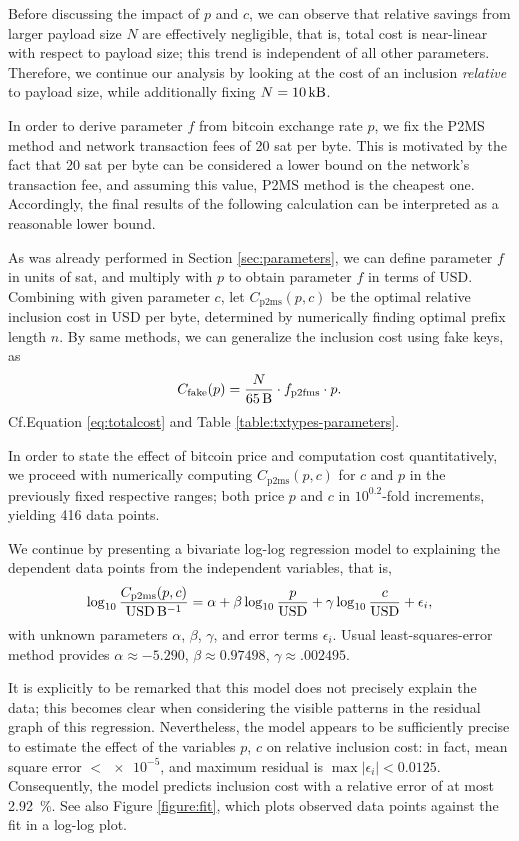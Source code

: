 \documentclass[a4paper,11pt,titlepage]{scrbook}
\begin{document}
Before discussing the impact of $p$ and $c$, we can observe that relative savings from larger payload size $N$ are effectively negligible, that is, total cost is near-linear with respect to payload size;
this trend is independent of all other parameters.
Therefore, we continue our analysis by looking at the cost of an inclusion \emph{relative} to payload size, while additionally fixing $N=\SI{10}{\kilo\byte}$.

In order to derive parameter $f$ from bitcoin exchange rate $p$, we fix the P2MS method and network transaction fees of 20 sat per byte.
This is motivated by the fact that 20 sat per byte can be considered a lower bound on the network's transaction fee, and assuming this value, P2MS method is the cheapest one.
Accordingly, the final results of the following calculation can be interpreted as a reasonable lower bound.

As was already performed in Section \ref{sec:parameters}, we can define parameter $f$ in units of sat, and multiply with $p$ to obtain parameter $f$ in terms of USD.
Combining with given parameter $c$, let $C_\text{p2ms}(p,c)$ be the optimal relative inclusion cost in USD per byte, determined by numerically finding optimal prefix length $n$.
By same methods, we can generalize the inclusion cost using fake keys, as
\[ C_\text{fake}(p) = \frac{N}{\SI{65}{\byte}} \cdot f_\text{p2fms} \cdot p. \]
Cf.\@ Equation \ref{eq:totalcost} and Table \ref{table:txtypes-parameters}.

In order to state the effect of bitcoin price and computation cost quantitatively, we proceed with numerically computing $C_\text{p2ms}(p,c)$ for $c$ and $p$ in the previously fixed respective ranges; both price $p$ and $c$ in $10^{0.2}$-fold increments, yielding 416 data points.

We continue by presenting a bivariate log-log regression model to explaining the dependent data points from the independent variables, that is,
\begin{equation} \log_{10} \frac{C_\text{p2ms}(p, c)}{\text{USD}\,\si{\per\byte}} = \alpha + \beta \log_{10} \frac{p}{\text{USD}} + \gamma \log_{10} \frac{c}{\text{USD}} + \epsilon_i, \label{eq:regressionmodel}\end{equation}
with unknown parameters $\alpha$, $\beta$, $\gamma$, and error terms $\epsilon_i$.
Usual least-squares-error method provides $\alpha \approx \num{-5.290}$, $\beta \approx\num{0.97498}$, $\gamma \approx\num{.002495}$.


It is explicitly to be remarked that this model does not precisely explain the data; this becomes clear when considering the visible patterns in the residual graph of this regression.
Nevertheless, the model appears to be sufficiently precise to estimate the effect of the variables $p$, $c$ on relative inclusion cost: in fact, mean square error $< \num{e-5}$, and maximum residual is $\max |\epsilon_i| < 0.0125$. Consequently, the model predicts inclusion cost with a relative error of at most \SI{2.92}{\percent}.
See also Figure \ref{figure:fit}, which plots observed data points against the fit in a log-log plot.
\end{document}
